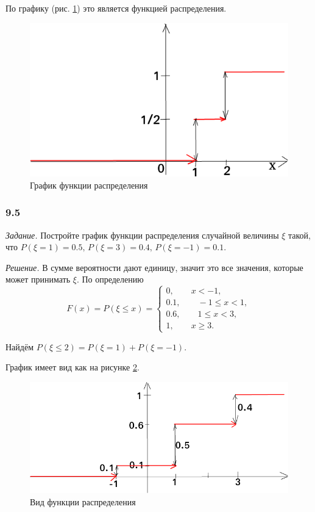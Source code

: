 \begin{enumerate}[label=\alph*)]
По графику (рис. \ref{fig:941}) это является функцией распределения.

\begin{figure}[h!]
  \centering
  \includegraphics[width=.4\textwidth]{./pictures/9_4_1.png}
  \caption{График функции распределения}
  \label{fig:941}
\end{figure}

\end{enumerate}

\subsubsection*{9.5}

\textit{Задание.} Постройте график функции распределения случайной величины $ \xi $ такой, что
$P \left( \xi = 1 \right) = 0.5, \,
P \left( \xi = 3 \right) = 0.4, \,
P \left( \xi = -1 \right) = 0.1$.

\textit{Решение.} В сумме вероятности дают единицу, значит это все значения, которые может принимать $ \xi $.
По определению
$$F \left( x \right) =
P \left( \xi \leq x \right) =
\begin{cases}
0, \qquad x < -1, \\
0.1, \qquad -1 \leq x < 1, \\
0.6, \qquad 1 \leq x < 3, \\
1, \qquad x \geq 3.
\end{cases}$$

Найдём $P \left( \xi \leq 2 \right) = P \left( \xi = 1 \right) + P \left( \xi = -1 \right) $.

График имеет вид как на рисунке \ref{fig:95}.

\begin{figure}[h!]
  \centering
  \includegraphics[width=.4\textwidth]{./pictures/9_5.png}
  \caption{Вид функции распределения}
  \label{fig:95}
\end{figure}

